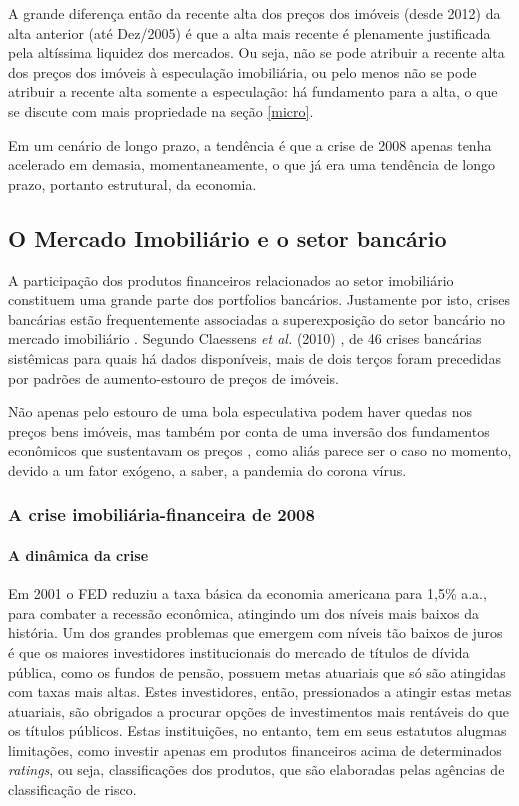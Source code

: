 \documentclass[
	12pt,				%
	oneside,			%
	a4paper,			%
	chapter=TITLE,		%
	section=TITLE,		%
	english,			%
	brazil				%
	]{abntex2}
\begin{document}
A grande diferença então da recente alta dos preços dos imóveis (desde
2012) da alta anterior (até Dez/2005) é que a alta mais recente é
plenamente justificada pela altíssima liquidez dos mercados. Ou seja,
não se pode atribuir a recente alta dos preços dos imóveis à especulação
imobiliária, ou pelo menos não se pode atribuir a recente alta somente a
especulação: há fundamento para a alta, o que se discute com mais
propriedade na seção \ref{micro}.

Em um cenário de longo prazo, a tendência é que a crise de 2008 apenas
tenha acelerado em demasia, momentaneamente, o que já era uma tendência
de longo prazo, portanto estrutural, da economia.

\subsection{O Mercado Imobiliário e o setor
bancário}\label{MI-e-o-setor-bancario}

A participação dos produtos financeiros relacionados ao setor
imobiliário constituem uma grande parte dos portfolios bancários.
Justamente por isto, crises bancárias estão frequentemente associadas a
superexposição do setor bancário no mercado imobiliário
\autocite[148]{Case2000}. Segundo Claessens \emph{et al.} (2010)
\autocite[\emph{apud}][3]{silver}, de 46 crises bancárias sistêmicas
para quais há dados disponíveis, mais de dois terços foram precedidas
por padrões de aumento-estouro de preços de imóveis.

Não apenas pelo estouro de uma bola especulativa podem haver quedas nos
preços bens imóveis, mas também por conta de uma inversão dos
fundamentos econômicos que sustentavam os preços
\autocite[129]{Case2000}, como aliás parece ser o caso no momento,
devido a um fator exógeno, a saber, a pandemia do corona vírus.

\subsubsection{A crise imobiliária-financeira de
2008}\label{a-crise-imobiliuxe1ria-financeira-de-2008}

\paragraph{A dinâmica da crise}\label{a-dinuxe2mica-da-crise}

Em 2001 o \gls{FED} reduziu a taxa básica da economia americana para
1,5\% a.a., para combater a recessão econômica, atingindo um dos níveis
mais baixos da história. Um dos grandes problemas que emergem com níveis
tão baixos de juros é que os maiores investidores institucionais do
mercado de títulos de dívida pública, como os fundos de pensão, possuem
metas atuariais que só são atingidas com taxas mais altas. Estes
investidores, então, pressionados a atingir estas metas atuariais, são
obrigados a procurar opções de investimentos mais rentáveis do que os
títulos públicos. Estas instituições, no entanto, tem em seus estatutos
alugmas limitações, como investir apenas em produtos financeiros acima
de determinados \emph{ratings}, ou seja, classificações dos produtos,
que são elaboradas pelas agências de classificação de risco.
\end{document}
